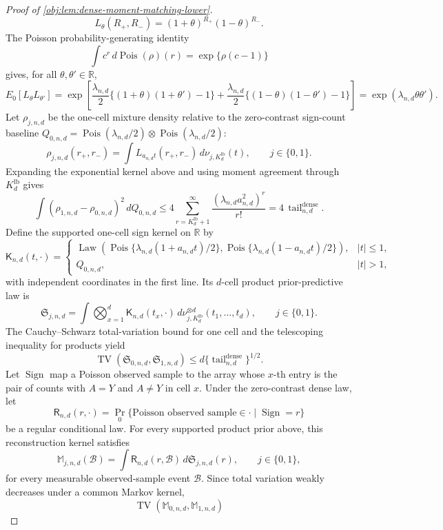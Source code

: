 \begin{proof}[Proof of \cref{obj:lem:dense-moment-matching-lower}]
\[
L_\theta(R_+,R_-)
=
(1+\theta)^{R_+}(1-\theta)^{R_-}.
\]
The Poisson probability-generating identity
\[
\int c^r\,d\operatorname{Pois}(\rho)(r)=\exp\{\rho(c-1)\}
\]
gives, for all \(\theta,\theta'\in\mathbb R\),
\[
E_0[L_\theta L_{\theta'}]
=
\exp\!\left[
\frac{\lambda_{n,d}}2\{(1+\theta)(1+\theta')-1\}
+
\frac{\lambda_{n,d}}2\{(1-\theta)(1-\theta')-1\}
\right]
=
\exp(\lambda_{n,d}\theta\theta').
\]
Let \(\rho_{j,n,d}\) be the one-cell mixture density relative to the zero-contrast sign-count baseline \(Q_{0,n,d}=\operatorname{Pois}(\lambda_{n,d}/2)\otimes\operatorname{Pois}(\lambda_{n,d}/2)\):
\[
\rho_{j,n,d}(r_+,r_-)
=
\int L_{a_{n,d}t}(r_+,r_-)\,d\nu_{j,K_d^{\mathrm{lb}}}(t),
\qquad j\in\{0,1\}.
\]
Expanding the exponential kernel above and using moment agreement through \(K_d^{\mathrm{lb}}\) gives
\[
\int (\rho_{1,n,d}-\rho_{0,n,d})^2\,dQ_{0,n,d}
\le
4\sum_{r=K_d^{\mathrm{lb}}+1}^{\infty}
\frac{(\lambda_{n,d}a_{n,d}^2)^r}{r!}
=
4\,\operatorname{tail}_{n,d}^{\mathrm{dense}}.
\]
Define the supported one-cell sign kernel on \(\mathbb R\) by
\[
\mathsf K_{n,d}(t,\cdot)
=
\begin{cases}
\operatorname{Law}\!\left(
\operatorname{Pois}\{\lambda_{n,d}(1+a_{n,d}t)/2\},
\operatorname{Pois}\{\lambda_{n,d}(1-a_{n,d}t)/2\}
\right), & |t|\le1,\\[0.4ex]
Q_{0,n,d}, & |t|>1,
\end{cases}
\]
with independent coordinates in the first line. Its \(d\)-cell product prior-predictive law is
\[
\mathfrak S_{j,n,d}
=
\int
\bigotimes_{x=1}^d \mathsf K_{n,d}(t_x,\cdot)\,
d\nu_{j,K_d^{\mathrm{lb}}}^{\otimes d}(t_1,\ldots,t_d),
\qquad j\in\{0,1\}.
\]
The Cauchy--Schwarz total-variation bound for one cell and the telescoping inequality for products yield
\[
\operatorname{TV}(\mathfrak S_{0,n,d},\mathfrak S_{1,n,d})
\le
d\{\operatorname{tail}_{n,d}^{\mathrm{dense}}\}^{1/2}.
\]
Let \(\operatorname{Sign}\) map a Poisson observed sample to the array whose \(x\)-th entry is the pair of counts with \(A=Y\) and \(A\ne Y\) in cell \(x\). Under the zero-contrast dense law, let
\[
\mathsf R_{n,d}(r,\cdot)
=
\Pr_{0}\{\text{Poisson observed sample}\in\cdot\mid \operatorname{Sign}=r\}
\]
be a regular conditional law. For every supported product prior above, this reconstruction kernel satisfies
\[
\mathbb M_{j,n,d}(\mathcal B)
=
\int \mathsf R_{n,d}(r,\mathcal B)\,d\mathfrak S_{j,n,d}(r),
\qquad j\in\{0,1\},
\]
for every measurable observed-sample event \(\mathcal B\). Since total variation weakly decreases under a common Markov kernel,
\[
\operatorname{TV}(\mathbb M_{0,n,d},\mathbb M_{1,n,d})
\]
\end{proof}
